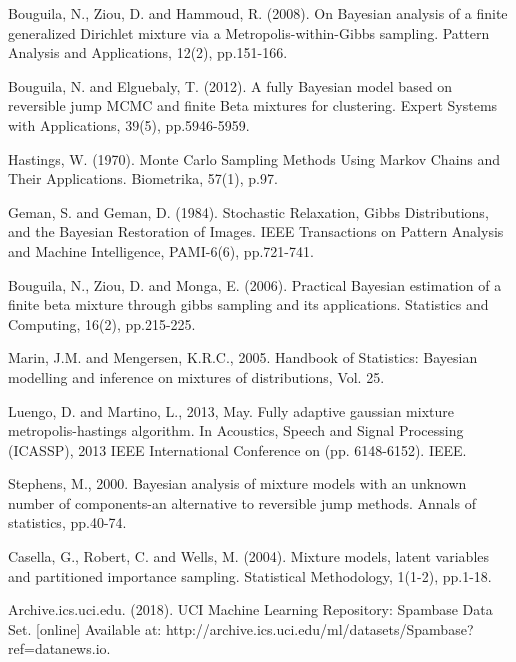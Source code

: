 \documentclass[conference]{IEEEtran}
\begin{document}
\begin{thebibliography}{[MT1]}
 Bouguila, N., Ziou, D. and Hammoud, R. (2008). On Bayesian analysis of a finite generalized Dirichlet mixture via a Metropolis-within-Gibbs sampling. Pattern Analysis and Applications, 12(2), pp.151-166.

 Bouguila, N. and Elguebaly, T. (2012). A fully Bayesian model based on reversible jump MCMC and finite Beta mixtures for clustering. Expert Systems with Applications, 39(5), pp.5946-5959.

 Hastings, W. (1970). Monte Carlo Sampling Methods Using Markov Chains and Their Applications. Biometrika, 57(1), p.97.

 Geman, S. and Geman, D. (1984). Stochastic Relaxation, Gibbs Distributions, and the Bayesian Restoration of Images. IEEE Transactions on Pattern Analysis and Machine Intelligence, PAMI-6(6), pp.721-741.

 Bouguila, N., Ziou, D. and Monga, E. (2006). Practical Bayesian estimation of a finite beta mixture through gibbs sampling and its applications. Statistics and Computing, 16(2), pp.215-225.



 Marin, J.M. and Mengersen, K.R.C., 2005. Handbook of Statistics: Bayesian modelling and inference on mixtures of distributions, Vol. 25.

 Luengo, D. and Martino, L., 2013, May. Fully adaptive gaussian mixture metropolis-hastings algorithm. In Acoustics, Speech and Signal Processing (ICASSP), 2013 IEEE International Conference on (pp. 6148-6152). IEEE.

 Stephens, M., 2000. Bayesian analysis of mixture models with an unknown number of components-an alternative to reversible jump methods. Annals of statistics, pp.40-74.


 Casella, G., Robert, C. and Wells, M. (2004). Mixture models, latent variables and partitioned importance sampling. Statistical Methodology, 1(1-2), pp.1-18.

 Archive.ics.uci.edu. (2018). UCI Machine Learning Repository: Spambase Data Set. [online] Available at: http://archive.ics.uci.edu/ml/datasets/Spambase?ref=datanews.io.
\end{thebibliography}
\end{document}
